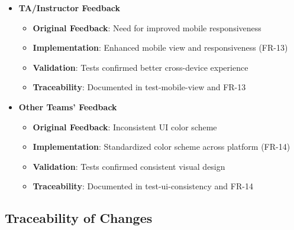 \documentclass[12pt, titlepage]{article}
\begin{document}
\begin{itemize}
    \item \textbf{TA/Instructor Feedback}
    \begin{itemize}
        \item \textbf{Original Feedback}: Need for improved mobile responsiveness
        \item \textbf{Implementation}: Enhanced mobile view and responsiveness (FR-13)
        \item \textbf{Validation}: Tests confirmed better cross-device experience
        \item \textbf{Traceability}: Documented in test-mobile-view and FR-13
    \end{itemize}
    
    \item \textbf{Other Teams' Feedback}
    \begin{itemize}
        \item \textbf{Original Feedback}: Inconsistent UI color scheme
        \item \textbf{Implementation}: Standardized color scheme across platform (FR-14)
        \item \textbf{Validation}: Tests confirmed consistent visual design
        \item \textbf{Traceability}: Documented in test-ui-consistency and FR-14
    \end{itemize}
\end{itemize}

\subsection{Traceability of Changes}
\end{document}
